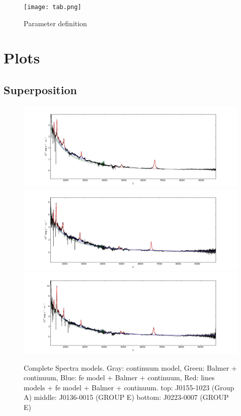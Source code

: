 \documentclass[usenatbib]{mn2e}
\begin{document}
\begin{figure}
\begin{center}
\texttt{[image: tab.png]}
\vspace{5mm}
\end{center} 
\caption{Parameter definition \label{fig:landscape}}   
\end{figure}
 
 \newpage

\section{Plots}

\subsection{Superposition}

\begin{figure}
\begin{center}
\includegraphics[width=0.6\linewidth,angle=0]{superposition_1.png}
\includegraphics[width=0.6\linewidth,angle=0]{superposition_17.png}\\
\includegraphics[width=0.6\linewidth,angle=0]{superposition_20.png}
\end{center} 
\caption{  Complete Spectra models.  Gray: continuum model, Green: Balmer + continuum, Blue: fe model + Balmer + continuum, Red: lines models + fe model + Balmer + continuum.  top: J0155-1023 (Group A) middle: J0136-0015 (GROUP E) bottom: J0223-0007 (GROUP E)     \label{fig:landscape}}   
\end{figure}
\end{document}
